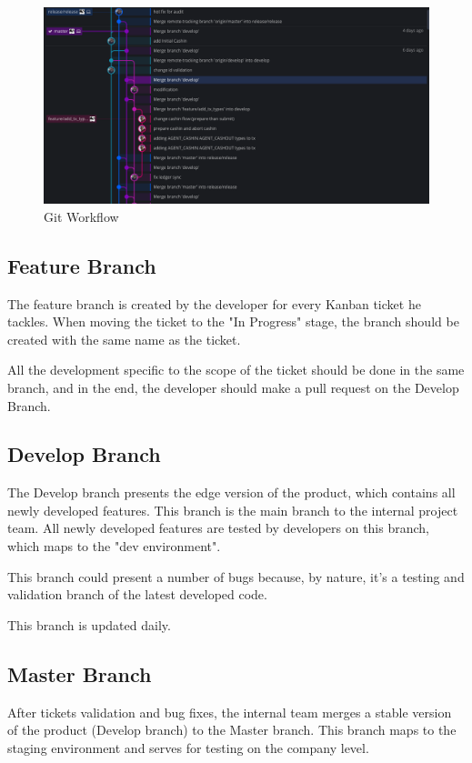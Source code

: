 \begin{spacing}{1.2}
\begin{figure}[H]\centering
\includegraphics[scale=0.4]{git_workflow.png}
\caption{Git Workflow}
\label{fig:git}
\end{figure}

\subsection{Feature Branch}
The feature branch is created by the developer for every Kanban ticket he tackles. When moving the ticket to the "In Progress" stage, the branch should be created with the same name as the ticket.

All the development specific to the scope of the ticket should be done in the same branch, and in the end, the developer should make a pull request on the Develop Branch.
\subsection{Develop Branch}
The Develop branch presents the edge version of the product, which contains all newly developed features. This branch is the main branch to the internal project team. All newly developed features are tested by developers on this branch, which maps to the "dev environment".

This branch could present a number of bugs because, by nature, it's a testing and validation branch of the latest developed code.

This branch is updated daily.
\subsection{Master Branch}
After tickets validation and bug fixes, the internal team merges a stable version of the product (Develop branch) to the Master branch. This branch maps to the staging environment and serves for testing on the company level.


\end{spacing}
